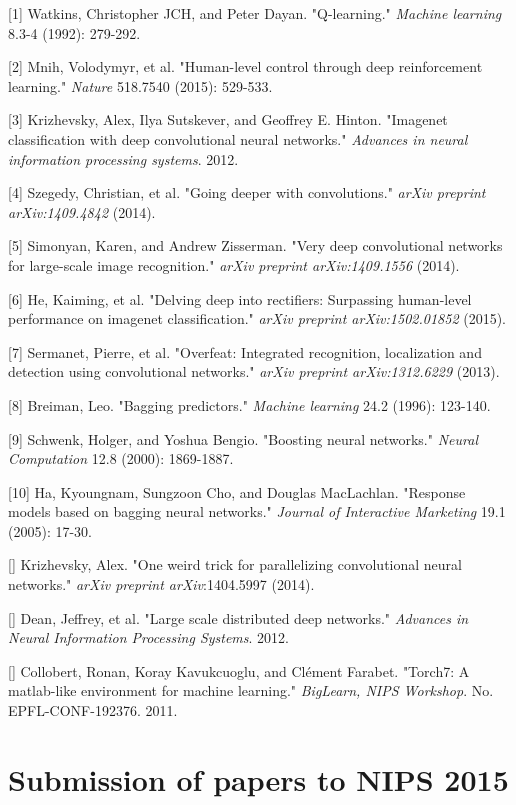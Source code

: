 \documentclass{article} %
\begin{document}
\small{
[1] Watkins, Christopher JCH, and Peter Dayan. "Q-learning." {\it Machine learning} 8.3-4 (1992): 279-292.

[2] Mnih, Volodymyr, et al. "Human-level control through deep reinforcement 
learning." {\it Nature} 518.7540 (2015): 529-533.

[3] Krizhevsky, Alex, Ilya Sutskever, and Geoffrey E. Hinton. "Imagenet classification with deep convolutional neural networks." {\it Advances in neural information processing systems}. 2012.

[4] Szegedy, Christian, et al. "Going deeper with convolutions." {\it arXiv preprint arXiv:1409.4842} (2014).

[5] Simonyan, Karen, and Andrew Zisserman. "Very deep convolutional networks for large-scale image recognition." {\it arXiv preprint arXiv:1409.1556} (2014).

[6] He, Kaiming, et al. "Delving deep into rectifiers: Surpassing human-level performance on imagenet classification." {\it arXiv preprint arXiv:1502.01852} (2015).

[7] Sermanet, Pierre, et al. "Overfeat: Integrated recognition, localization and detection using convolutional networks." {\it arXiv preprint arXiv:1312.6229} (2013).

[8] Breiman, Leo. "Bagging predictors." {\it Machine learning} 24.2 (1996): 123-140.

[9] Schwenk, Holger, and Yoshua Bengio. "Boosting neural networks." {\it Neural Computation} 12.8 (2000): 1869-1887.

[10] Ha, Kyoungnam, Sungzoon Cho, and Douglas MacLachlan. "Response models based on bagging neural networks." {\it Journal of Interactive Marketing} 19.1 (2005): 17-30.

[] Krizhevsky, Alex. "One weird trick for parallelizing convolutional neural networks." {\it arXiv preprint arXiv}:1404.5997 (2014).

[] Dean, Jeffrey, et al. "Large scale distributed deep networks." {\it Advances in Neural Information Processing Systems}. 2012.

[] Collobert, Ronan, Koray Kavukcuoglu, and Clément Farabet. "Torch7: A matlab-like environment for machine learning." {\it BigLearn, NIPS Workshop}. No. EPFL-CONF-192376. 2011.
}

\section{Submission of papers to NIPS 2015}
\end{document}
